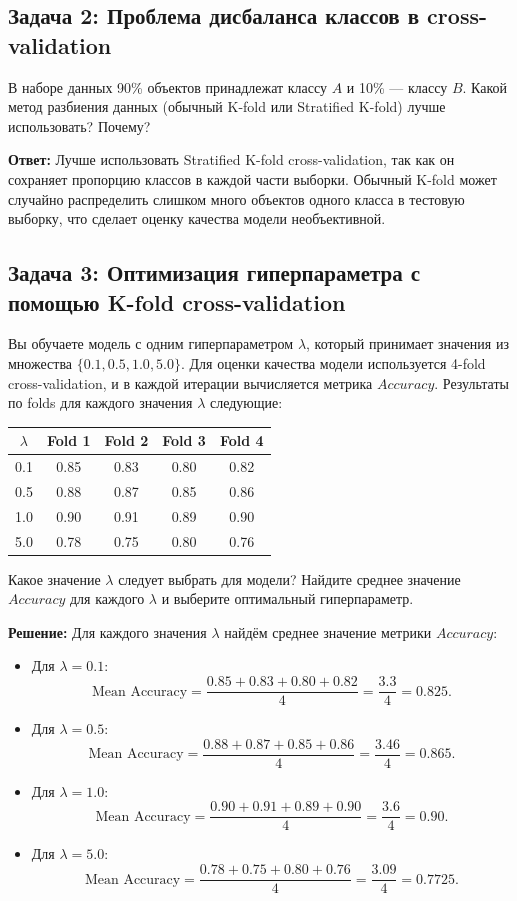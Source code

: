 \subsection*{Задача 2: Проблема дисбаланса классов в cross-validation}
В наборе данных 90\% объектов принадлежат классу $A$ и 10\% — классу $B$. Какой метод разбиения данных (обычный K-fold или Stratified K-fold) лучше использовать? Почему?

\textbf{Ответ:}
Лучше использовать Stratified K-fold cross-validation, так как он сохраняет пропорцию классов в каждой части выборки. Обычный K-fold может случайно распределить слишком много объектов одного класса в тестовую выборку, что сделает оценку качества модели необъективной.

\subsection*{Задача 3: Оптимизация гиперпараметра с помощью K-fold cross-validation}
Вы обучаете модель с одним гиперпараметром $\lambda$, который принимает значения из множества $\{0.1, 0.5, 1.0, 5.0\}$. Для оценки качества модели используется 4-fold cross-validation, и в каждой итерации вычисляется метрика $Accuracy$. Результаты по folds для каждого значения $\lambda$ следующие:

\begin{tabular}{|c|c|c|c|c|}
    \hline
    $\lambda$ & Fold 1 & Fold 2 & Fold 3 & Fold 4 \\ \hline
    0.1       & 0.85   & 0.83   & 0.80   & 0.82   \\ \hline
    0.5       & 0.88   & 0.87   & 0.85   & 0.86   \\ \hline
    1.0       & 0.90   & 0.91   & 0.89   & 0.90   \\ \hline
    5.0       & 0.78   & 0.75   & 0.80   & 0.76   \\ \hline
\end{tabular}

Какое значение $\lambda$ следует выбрать для модели? Найдите среднее значение $Accuracy$ для каждого $\lambda$ и выберите оптимальный гиперпараметр.

\textbf{Решение:}
Для каждого значения $\lambda$ найдём среднее значение метрики $Accuracy$:
\begin{itemize}
    \item Для $\lambda = 0.1$:
          \[
              \text{Mean Accuracy} = \frac{0.85 + 0.83 + 0.80 + 0.82}{4} = \frac{3.3}{4} = 0.825.
          \]
    \item Для $\lambda = 0.5$:
          \[
              \text{Mean Accuracy} = \frac{0.88 + 0.87 + 0.85 + 0.86}{4} = \frac{3.46}{4} = 0.865.
          \]
    \item Для $\lambda = 1.0$:
          \[
              \text{Mean Accuracy} = \frac{0.90 + 0.91 + 0.89 + 0.90}{4} = \frac{3.6}{4} = 0.90.
          \]
    \item Для $\lambda = 5.0$:
          \[
              \text{Mean Accuracy} = \frac{0.78 + 0.75 + 0.80 + 0.76}{4} = \frac{3.09}{4} = 0.7725.
          \]
\end{itemize}

